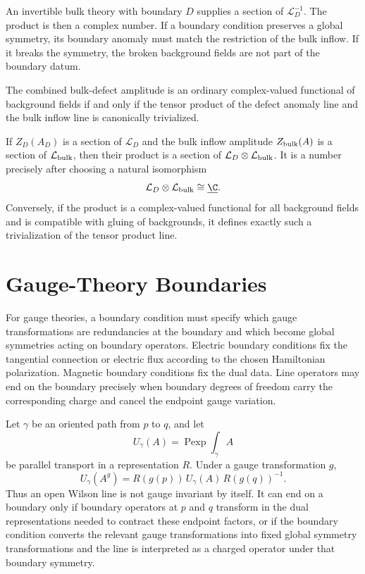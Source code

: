 An invertible bulk theory with boundary \(D\) supplies a section of
\(\mathcal L_D^{-1}\).  The product is then a complex number.  If a boundary
condition preserves a global symmetry, its boundary anomaly must match the
restriction of the bulk inflow.  If it breaks the symmetry, the broken
background fields are not part of the boundary datum.

\begin{remark}
\label{rem:inflow-line-trivialization}
The combined bulk-defect amplitude is an ordinary complex-valued functional
of background fields if and only if the tensor product of the defect anomaly
line and the bulk inflow line is canonically trivialized.

If \(Z_D(A_D)\) is a section of \(\mathcal L_D\) and the bulk inflow
amplitude \(Z_{\rm bulk}(A)\) is a section of \(\mathcal L_{\rm bulk}\), then
their product is a section of
\(\mathcal L_D\otimes\mathcal L_{\rm bulk}\).  It is a number precisely after
choosing a natural isomorphism
\[
  \mathcal L_D\otimes\mathcal L_{\rm bulk}\cong\underline{\C}.
\]
Conversely, if the product is a complex-valued functional for all background
fields and is compatible with gluing of backgrounds, it defines exactly such
a trivialization of the tensor product line.
\end{remark}

\section{Gauge-Theory Boundaries}

For gauge theories, a boundary condition must specify which gauge
transformations are redundancies at the boundary and which become global
symmetries acting on boundary operators.  Electric boundary conditions fix
the tangential connection or electric flux according to the chosen
Hamiltonian polarization.  Magnetic boundary conditions fix the dual data.
Line operators may end on the boundary precisely when boundary degrees of
freedom carry the corresponding charge and cancel the endpoint gauge
variation.

\begin{example}
\label{ex:wilson-line-endpoint-boundary}
Let \(\gamma\) be an oriented path from \(p\) to \(q\), and let
\[
  U_\gamma(A)=\operatorname{Pexp}\int_\gamma A
\]
be parallel transport in a representation \(R\).  Under a gauge
transformation \(g\),
\[
  U_\gamma(A^g)=R(g(p))\,U_\gamma(A)\,R(g(q))^{-1}.
\]
Thus an open Wilson line is not gauge invariant by itself.  It can end on a
boundary only if boundary operators at \(p\) and \(q\) transform in the dual
representations needed to contract these endpoint factors, or if the
boundary condition converts the relevant gauge transformations into fixed
global symmetry transformations and the line is interpreted as a charged
operator under that boundary symmetry.
\end{example}

